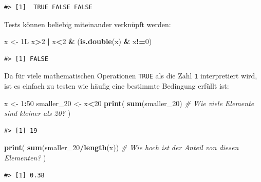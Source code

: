 \documentclass[]{book}
\newenvironment{Shaded}{\begin{snugshade}}{\end{snugshade}}
\newcommand{\KeywordTok}[1]{\textcolor[rgb]{0.13,0.29,0.53}{\textbf{#1}}}
\newcommand{\DecValTok}[1]{\textcolor[rgb]{0.00,0.00,0.81}{#1}}
\newcommand{\StringTok}[1]{\textcolor[rgb]{0.31,0.60,0.02}{#1}}
\newcommand{\CommentTok}[1]{\textcolor[rgb]{0.56,0.35,0.01}{\textit{#1}}}
\newcommand{\OperatorTok}[1]{\textcolor[rgb]{0.81,0.36,0.00}{\textbf{#1}}}
\newcommand{\NormalTok}[1]{#1}
\begin{document}
\begin{verbatim}
#> [1]  TRUE FALSE FALSE
\end{verbatim}

Tests können beliebig miteinander verknüpft werden:

\begin{Shaded}
\begin{Highlighting}[]
\NormalTok{x <-}\StringTok{ }\NormalTok{1L}
\NormalTok{x}\OperatorTok{>}\DecValTok{2} \OperatorTok{|}\StringTok{ }\NormalTok{x}\OperatorTok{<}\DecValTok{2} \OperatorTok{&}\StringTok{ }\NormalTok{(}\KeywordTok{is.double}\NormalTok{(x) }\OperatorTok{&}\StringTok{ }\NormalTok{x}\OperatorTok{!=}\DecValTok{0}\NormalTok{)}
\end{Highlighting}
\end{Shaded}

\begin{verbatim}
#> [1] FALSE
\end{verbatim}

Da für viele mathematischen Operationen \texttt{TRUE} als die Zahl
\texttt{1} interpretiert wird, ist es einfach zu testen wie häufig eine
bestimmte Bedingung erfüllt ist:

\begin{Shaded}
\begin{Highlighting}[]
\NormalTok{x <-}\StringTok{ }\DecValTok{1}\OperatorTok{:}\DecValTok{50} 
\NormalTok{smaller_}\DecValTok{20}\NormalTok{ <-}\StringTok{ }\NormalTok{x}\OperatorTok{<}\DecValTok{20} 
\KeywordTok{print}\NormalTok{(}
  \KeywordTok{sum}\NormalTok{(smaller_}\DecValTok{20}\NormalTok{) }\CommentTok{# Wie viele Elemente sind kleiner als 20?}
\NormalTok{  )}
\end{Highlighting}
\end{Shaded}

\begin{verbatim}
#> [1] 19
\end{verbatim}

\begin{Shaded}
\begin{Highlighting}[]
\KeywordTok{print}\NormalTok{(}
  \KeywordTok{sum}\NormalTok{(smaller_}\DecValTok{20}\OperatorTok{/}\KeywordTok{length}\NormalTok{(x)) }\CommentTok{# Wie hoch ist der Anteil von diesen Elementen?}
\NormalTok{)}
\end{Highlighting}
\end{Shaded}

\begin{verbatim}
#> [1] 0.38
\end{verbatim}
\end{document}
